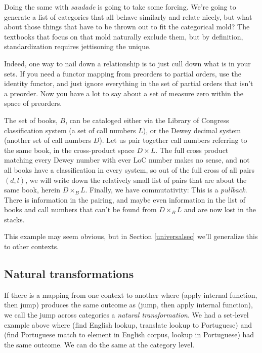 \documentclass[11pt]{article}
\begin{document}
Doing the same with {\em saudade} is going to take some forcing.
We're going to generate a list of
categories that all behave similarly and relate nicely, but what about those things
that have to be thrown out to fit the categorical mold? The textbooks that focus on
that mold naturally exclude them, but by definition, standardization requires jettisoning 
the unique.

Indeed, one way to nail down a relationship is to just cull down what is in your sets.
If you need a functor mapping from preorders to partial orders, use the identity functor,
and just ignore everything in the set of partial orders that isn't a preorder. Now you
have a lot to say about a set of measure zero within the space of preorders.

The set of books, $B$, can be cataloged either via the Library of Congress classification system
(a set of call numbers $L$), or the Dewey decimal system (another set of call numbers
$D$). Let us pair together call numbers referring to the same book, in the cross-product
space $D\times L$. The full cross product matching every Dewey number with ever LoC
number makes no sense, and not all books have a classification in every system,
so out of the full cross of all pairs $(d, l)$, we will write down the relatively
small list of pairs that are about the same book, herein $D\times_B L$.  Finally,
we have commutativity:
This is a {\em pullback}. There is information in the pairing, and maybe even
information in the list of books and call numbers that can't be found from $D\times_B L$
and are now lost in the stacks.

This example may seem obvious, but in Section \ref{universalsec} we'll generalize this
to other contexts.

\subsection{Natural transformations}
If there is a mapping from one context to another where (apply internal function,
then jump) produces the same outcome as (jump, then apply internal function), we call
the jump across categories a {\em natural transformation}. We had a set-level example
above where (find English lookup, translate lookup to Portuguese) and (find Portuguese
match to element in English corpus, lookup in Portuguese) had the same outcome. We can do
the same at the category level.
\end{document}

